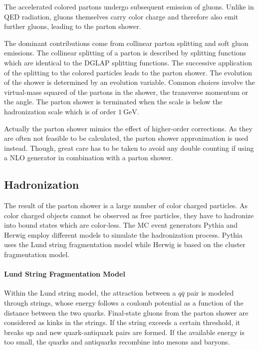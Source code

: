 The accelerated colored partons undergo subsequent emission of gluons. Unlike in
QED radiation, gluons themselves carry color charge and therefore also emit
further gluons, leading to the parton shower. 

The dominant contributions come from collinear parton splitting and soft gluon
emissions. The collinear splitting of a parton is described by splitting
functions which are identical to the DGLAP splitting functions. The
successive application of the splitting to the colored particles leads to the
parton shower. The evolution of the shower is determined by an evolution
variable. Common choices involve the virtual-mass squared of the partons in the
shower, the transverse momentum or the angle. The parton shower is terminated
when the scale is below the hadronization scale which is of order $\SI{1}{\GeV}$.

Actually the parton shower mimics the effect of higher-order corrections. As
they are often not feasible to be calculated, the parton shower approximation is
used instead. Though, great care has to be taken to avoid any double counting if
using a NLO generator in combination with a parton shower.

\subsection{Hadronization}

The result of the parton shower is a large number of color charged particles. As
color charged objects cannot be observed as free particles, they have to
hadronize into bound states which are color-less. The MC event generators Pythia
and Herwig employ different models to simulate the hadronization process. Pythia
uses the Lund string fragmentation model while Herwig is based on the cluster
fragmentation model.

\paragraph{Lund String Fragmentation Model}

Within the Lund string model, the attraction between a $q\bar q$ pair is
modeled through strings, whose energy follows a coulomb potential as a function
of the distance between the two quarks. Final-state gluons from the parton
shower are considered as kinks in the strings. If the string exceeds a certain
threshold, it breaks up and new quark-antiquark pairs are formed. If the
available energy is too small, the quarks and antiquarks recombine into mesons
and baryons.

